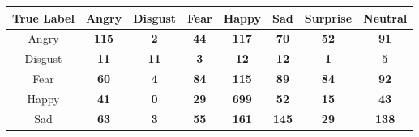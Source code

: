 \documentclass[12pt,a4paper]{article}
\begin{document}
\begin{figure}[h!]
    \centering
    \begin{tabular}{|c||ccccccc|}
\hline
True Label & Angry & Disgust & Fear & Happy & Sad & Surprise & Neutral \\
\hline\hline
Angry & \cellcolor[HTML]{F5F5FF}\textcolor[HTML]{000000}{\textbf{115}} & \cellcolor[HTML]{F5F5FF}\textcolor[HTML]{000000}{\textbf{2}} & \cellcolor[HTML]{F5F5FF}\textcolor[HTML]{000000}{\textbf{44}} & \cellcolor[HTML]{F5F5FF}\textcolor[HTML]{000000}{\textbf{117}} & \cellcolor[HTML]{F5F5FF}\textcolor[HTML]{000000}{\textbf{70}} & \cellcolor[HTML]{F5F5FF}\textcolor[HTML]{000000}{\textbf{52}} & \cellcolor[HTML]{F5F5FF}\textcolor[HTML]{000000}{\textbf{91}} \\
Disgust & \cellcolor[HTML]{F5F5FF}\textcolor[HTML]{000000}{\textbf{11}} & \cellcolor[HTML]{F5F5FF}\textcolor[HTML]{000000}{\textbf{11}} & \cellcolor[HTML]{F5F5FF}\textcolor[HTML]{000000}{\textbf{3}} & \cellcolor[HTML]{F5F5FF}\textcolor[HTML]{000000}{\textbf{12}} & \cellcolor[HTML]{F5F5FF}\textcolor[HTML]{000000}{\textbf{12}} & \cellcolor[HTML]{F5F5FF}\textcolor[HTML]{000000}{\textbf{1}} & \cellcolor[HTML]{F5F5FF}\textcolor[HTML]{000000}{\textbf{5}} \\
Fear & \cellcolor[HTML]{F5F5FF}\textcolor[HTML]{000000}{\textbf{60}} & \cellcolor[HTML]{F5F5FF}\textcolor[HTML]{000000}{\textbf{4}} & \cellcolor[HTML]{F5F5FF}\textcolor[HTML]{000000}{\textbf{84}} & \cellcolor[HTML]{F5F5FF}\textcolor[HTML]{000000}{\textbf{115}} & \cellcolor[HTML]{F5F5FF}\textcolor[HTML]{000000}{\textbf{89}} & \cellcolor[HTML]{F5F5FF}\textcolor[HTML]{000000}{\textbf{84}} & \cellcolor[HTML]{F5F5FF}\textcolor[HTML]{000000}{\textbf{92}} \\
Happy & \cellcolor[HTML]{F5F5FF}\textcolor[HTML]{000000}{\textbf{41}} & \cellcolor[HTML]{F5F5FF}\textcolor[HTML]{000000}{\textbf{0}} & \cellcolor[HTML]{F5F5FF}\textcolor[HTML]{000000}{\textbf{29}} & \cellcolor[HTML]{0C2340}\textcolor[HTML]{ffffff}{\textbf{699}} & \cellcolor[HTML]{F5F5FF}\textcolor[HTML]{000000}{\textbf{52}} & \cellcolor[HTML]{F5F5FF}\textcolor[HTML]{000000}{\textbf{15}} & \cellcolor[HTML]{F5F5FF}\textcolor[HTML]{000000}{\textbf{43}} \\
Sad & \cellcolor[HTML]{F5F5FF}\textcolor[HTML]{000000}{\textbf{63}} & \cellcolor[HTML]{F5F5FF}\textcolor[HTML]{000000}{\textbf{3}} & \cellcolor[HTML]{F5F5FF}\textcolor[HTML]{000000}{\textbf{55}} & \cellcolor[HTML]{C8D5F0}\textcolor[HTML]{000000}{\textbf{161}} & \cellcolor[HTML]{C8D5F0}\textcolor[HTML]{000000}{\textbf{145}} & \cellcolor[HTML]{F5F5FF}\textcolor[HTML]{000000}{\textbf{29}} & \cellcolor[HTML]{F5F5FF}\textcolor[HTML]{000000}{\textbf{138}} \\

\end{tabular}
\end{figure}
\end{document}
